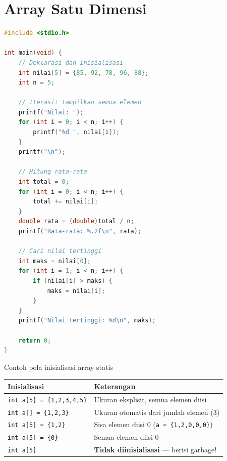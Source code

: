 \documentclass[../main.tex]{subfiles}
\begin{document}
\section{Array Satu Dimensi}

\begin{lstlisting}[language=C,caption=Deklarasi dan operasi array 1D]
#include <stdio.h>

int main(void) {
    // Deklarasi dan inisialisasi
    int nilai[5] = {85, 92, 78, 96, 88};
    int n = 5;
    
    // Iterasi: tampilkan semua elemen
    printf("Nilai: ");
    for (int i = 0; i < n; i++) {
        printf("%d ", nilai[i]);
    }
    printf("\n");
    
    // Hitung rata-rata
    int total = 0;
    for (int i = 0; i < n; i++) {
        total += nilai[i];
    }
    double rata = (double)total / n;
    printf("Rata-rata: %.2f\n", rata);
    
    // Cari nilai tertinggi
    int maks = nilai[0];
    for (int i = 1; i < n; i++) {
        if (nilai[i] > maks) {
            maks = nilai[i];
        }
    }
    printf("Nilai tertinggi: %d\n", maks);
    
    return 0;
}
\end{lstlisting}



\begin{modultable}[]{Contoh pola inisialisasi array statis}
\begin{tabular}{|l|p{9cm}|}
\hline
\textbf{Inisialisasi} & \textbf{Keterangan} \\
\hline
\texttt{int a[5] = \{1,2,3,4,5\}} & Ukuran eksplisit, semua elemen diisi \\
\hline
\texttt{int a[] = \{1,2,3\}} & Ukuran otomatis dari jumlah elemen (3) \\
\hline
\texttt{int a[5] = \{1,2\}} & Sisa elemen diisi 0 (\texttt{a = \{1,2,0,0,0\}}) \\
\hline
\texttt{int a[5] = \{0\}} & Semua elemen diisi 0 \\
\hline
\texttt{int a[5]} & \textbf{Tidak diinisialisasi} --- berisi garbage! \\
\hline
\end{tabular}
\end{modultable}
\end{document}
